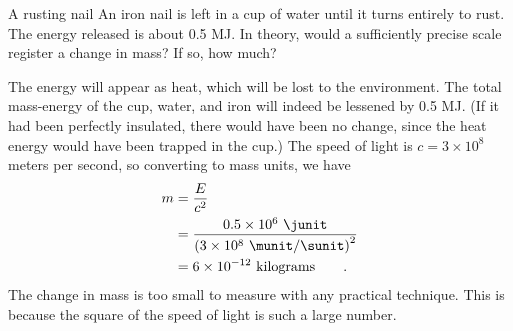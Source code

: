 \begin{eg}{A rusting nail}\label{eg:rustingnail}
\egquestion
An iron nail is left in a cup of water
until it turns entirely to rust. The energy released is
about 0.5 MJ. In theory, would a sufficiently
precise scale register a change in mass? If so, how much?

\eganswer
 The energy will appear as heat, which will be lost
to the environment. The total mass-energy of the cup,
water, and iron will indeed be lessened by 0.5 MJ. (If it
had been perfectly insulated, there would have been no
change, since the heat energy would have been trapped in the
cup.) The speed of light is
$c=3\times10^8$ meters per second, so converting to mass units, we have
\begin{align*}
                m         &=    \frac{E}{c^2}  \\
                        &= \frac{0.5\times10^6\ \junit}{\left(3\times10^8\ \munit/\sunit\right)^2} \\
                         &=    6\times10^{-12}\  \text{kilograms}   \qquad   .
\end{align*}
The change in mass is too small to measure with any
practical technique. This is because the square of the speed
of light is such a large number.
\end{eg}

